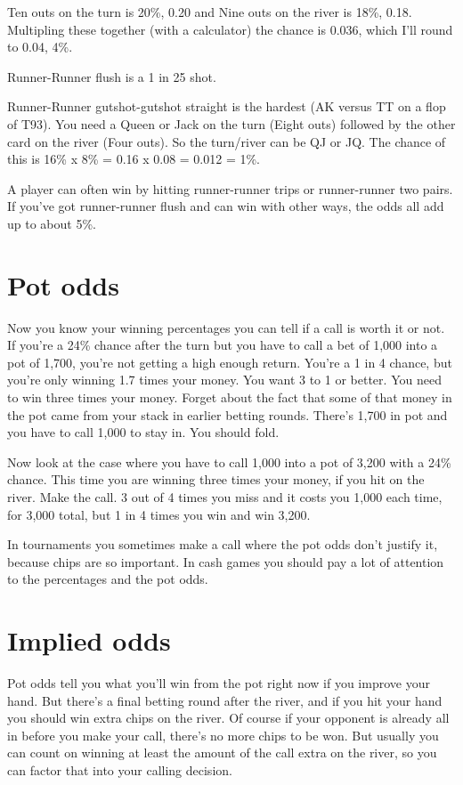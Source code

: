Ten outs on the turn is 20\%, 0.20 and Nine outs on the river is
18\%, 0.18. Multipling these together (with a calculator) the chance
is 0.036, which I'll round to 0.04, 4\%.

Runner-Runner flush is a 1 in 25 shot.

Runner-Runner gutshot-gutshot straight is the hardest (AK versus TT on
a flop of T93). You need a Queen or Jack on the turn (Eight outs)
followed by the other card on the river (Four outs). So the turn/river
can be QJ or JQ. The chance of this is 16\% x 8\% = 0.16 x 0.08 =
0.012 = 1\%.

A player can often win by hitting runner-runner trips or runner-runner
two pairs. If you've got runner-runner flush and can win with other
ways, the odds all add up to about 5\%.

\section{Pot odds}

Now you know your winning percentages you can tell if a call is worth
it or not. If you're a 24\% chance after the turn but you have to call
a bet of 1,000 into a pot of 1,700, you're not getting a high enough
return. You're a 1 in 4 chance, but you're only winning 1.7 times your
money. You want 3 to 1 or better. You need to win three times your
money. Forget about the fact that some of that money in the pot came
from your stack in earlier betting rounds. There's 1,700 in pot and
you have to call 1,000 to stay in. You should fold.


Now look at the case where you have to call 1,000
into a pot of 3,200 with a 24\% chance. This time you are winning
three times your money, if you hit on the river. Make the call. 3 out
of 4 times you miss and it costs you 1,000 each time, for 3,000 total,
but 1 in 4 times you win and win 3,200.


In tournaments you sometimes make a call where the pot odds don't
justify it, because chips are so important. In cash games you should
pay a lot of attention to the percentages and the pot odds.

\section{Implied odds}

Pot odds tell you what you'll win from the pot right now if you
improve your hand. But there's a final betting round after the river,
and if you hit your hand you should win extra chips on the river. Of
course if your opponent is already all in before you make your call,
there's no more chips to be won. But usually you can count on winning
at least the amount of the call extra on the river, so you can factor
that into your calling decision.

